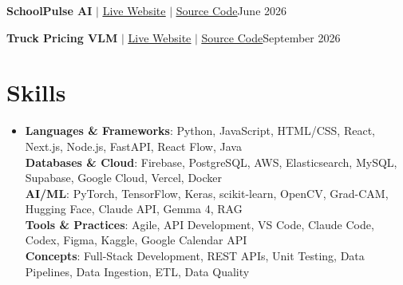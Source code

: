 \documentclass[letterpaper,10pt]{article}
\begin{document}
    \resumeProjectHeading
      {\textbf{SchoolPulse AI} $|$ \href{https://school-pulse-ai.vercel.app/}{\underline{Live Website}} $|$ \href{https://github.com/vignesh-nagarajan-vn/SchoolPulse-AI}{\underline{Source Code}}}{June 2026}
      \resumeItemListStart
      \resumeItemListEnd

    \resumeProjectHeading
      {\textbf{Truck Pricing VLM} $|$ \href{https://truck-pricing-vlm.vercel.app/}{\underline{Live Website}} $|$ \href{https://github.com/Raghavsk24/Truck-Pricing-VLM}{\underline{Source Code}}}{September 2026}
      \resumeItemListStart
      \resumeItemListEnd

  \resumeSubHeadingListEnd


\section{Skills}
 \begin{itemize}[leftmargin=0.15in, label={}]
    \item{
     \textbf{Languages \& Frameworks}{: Python, JavaScript, HTML/CSS, React, Next.js, Node.js, FastAPI, React Flow, Java} \\
     \textbf{Databases \& Cloud}{: Firebase, PostgreSQL, AWS, Elasticsearch, MySQL, Supabase, Google Cloud, Vercel, Docker} \\
     \textbf{AI/ML}{: PyTorch, TensorFlow, Keras, scikit-learn, OpenCV, Grad-CAM, Hugging Face, Claude API, Gemma 4, RAG} \\
     \textbf{Tools \& Practices}{: Agile, API Development, VS Code, Claude Code, Codex, Figma, Kaggle, Google Calendar API} \\
     \textbf{Concepts}{: Full-Stack Development, REST APIs, Unit Testing, Data Pipelines, Data Ingestion, ETL, Data Quality}
    }
 \end{itemize}
 \vspace{3.53pt}

\end{document}
